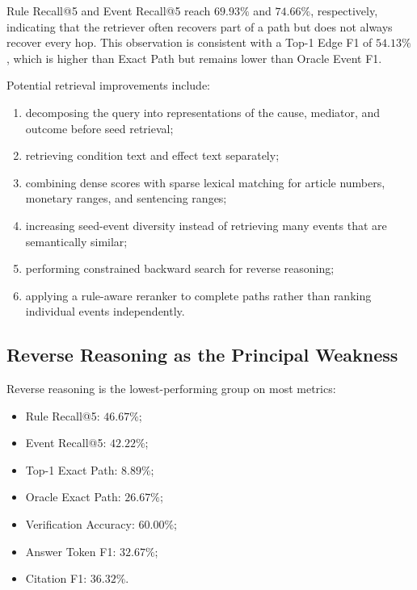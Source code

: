Rule Recall@5 and Event Recall@5 reach \(69.93\%\) and \(74.66\%\),
respectively, indicating that the retriever often recovers part of a path
but does not always recover every hop. This observation is consistent with
a Top-1 Edge F1 of \(54.13\%\), which is higher than Exact Path but remains
lower than Oracle Event F1.

Potential retrieval improvements include:

\begin{enumerate}
    \item decomposing the query into representations of the cause, mediator,
    and outcome before seed retrieval;

    \item retrieving condition text and effect text separately;

    \item combining dense scores with sparse lexical matching for article
    numbers, monetary ranges, and sentencing ranges;

    \item increasing seed-event diversity instead of retrieving many events
    that are semantically similar;

    \item performing constrained backward search for reverse reasoning;

    \item applying a rule-aware reranker to complete paths rather than
    ranking individual events independently.
\end{enumerate}

\subsection{Reverse Reasoning as the Principal Weakness}

Reverse reasoning is the lowest-performing group on most metrics:

\begin{itemize}
    \item Rule Recall@5: \(46.67\%\);
    \item Event Recall@5: \(42.22\%\);
    \item Top-1 Exact Path: \(8.89\%\);
    \item Oracle Exact Path: \(26.67\%\);
    \item Verification Accuracy: \(60.00\%\);
    \item Answer Token F1: \(32.67\%\);
    \item Citation F1: \(36.32\%\).
\end{itemize}

